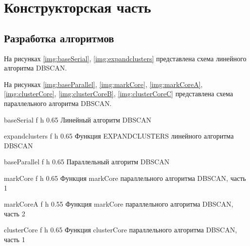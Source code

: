 \chapter{Конструкторская часть}

\section{Разработка алгоритмов}

На рисунках \ref{img:baseSerial}, \ref{img:expandclusters} представлена схема линейного алгоритма DBSCAN. 

На рисунках \ref{img:baseParallel}, \ref{img:markCore}, \ref{img:markCoreA}, \ref{img:clusterCore}, \ref{img:clusterCoreB}, \ref{img:clusterCoreC} представлена схема параллельного алгоритма DBSCAN.

{baseSerial} %
{f} %
{h} %
{0.65\textwidth} %
{Линейный алгоритм DBSCAN} %
\clearpage

{expandclusters} %
{f} %
{h} %
{0.65\textwidth} %
{Функция EXPANDCLUSTERS линейного алгоритма DBSCAN} %
\clearpage

{baseParallel} %
{f} %
{h} %
{0.65\textwidth} %
{Параллельный алгоритм DBSCAN} %
\clearpage

{markCore} %
{f} %
{h} %
{0.65\textwidth} %
{Функция markCore параллельного алгоритма DBSCAN, часть 1} %
\clearpage

{markCoreA} %
{f} %
{h} %
{0.55\textwidth} %
{Функция markCore параллельного алгоритма DBSCAN, часть 2} %
\clearpage

{clusterCore} %
{f} %
{h} %
{0.65\textwidth} %
{Функция clusterCore параллельного алгоритма DBSCAN, часть 1} %
\clearpage

